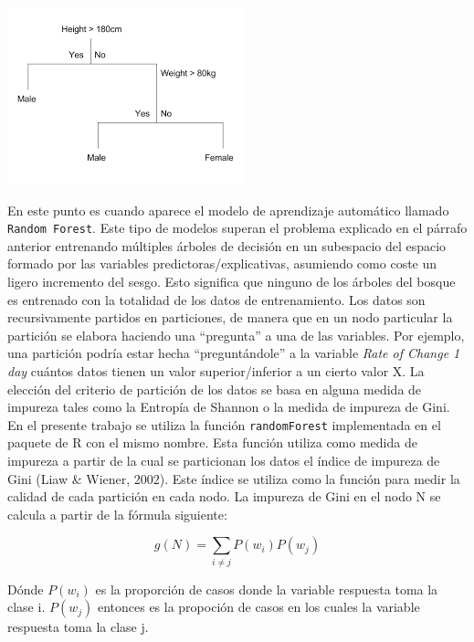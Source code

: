 \documentclass[]{DissertateUSU}
\begin{document}
\centering

\includegraphics{CART.png} \centering
{}

\setlength\parskip{5ex}
\justifying

\noindent En este punto es cuando aparece el modelo de aprendizaje
automático llamado \texttt{Random\ Forest}. Este tipo de modelos superan
el problema explicado en el párrafo anterior entrenando múltiples
árboles de decisión en un subespacio del espacio formado por las
variables predictoras/explicativas, asumiendo como coste un ligero
incremento del sesgo. Esto significa que ninguno de los árboles del
bosque es entrenado con la totalidad de los datos de entrenamiento. Los
datos son recursivamente partidos en particiones, de manera que en un
nodo particular la partición se elabora haciendo una ``pregunta'' a una
de las variables. Por ejemplo, una partición podría estar hecha
``preguntándole'' a la variable \emph{Rate of Change 1 day} cuántos
datos tienen un valor superior/inferior a un cierto valor X. La elección
del criterio de partición de los datos se basa en alguna medida de
impureza tales como la Entropía de Shannon o la medida de impureza de
Gini. En el presente trabajo se utiliza la función \texttt{randomForest}
implementada en el paquete de R con el mismo nombre. Esta función
utiliza como medida de impureza a partir de la cual se particionan los
datos el índice de impureza de Gini (Liaw \& Wiener, 2002). Este índice
se utiliza como la función para medir la calidad de cada partición en
cada nodo. La impureza de Gini en el nodo N se calcula a partir de la
fórmula siguiente:

\[g(N)=\sum_{i\neq j}P(w_i)P(w_j)\]

\noindent Dónde \(P(w_i)\) es la proporción de casos donde la variable
respuesta toma la clase i. \(P(w_j)\) entonces es la propoción de casos
en los cuales la variable respuesta toma la clase j.
\end{document}
